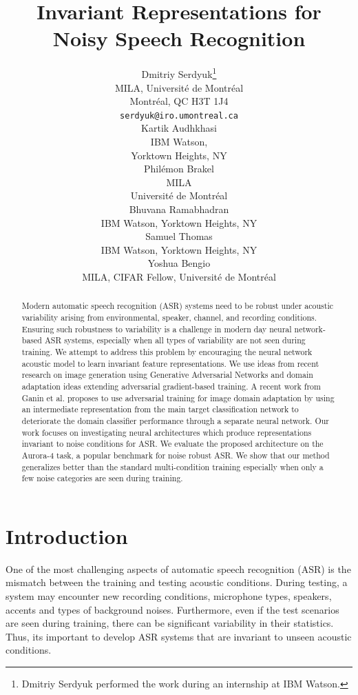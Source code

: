 \documentclass{article}
\title{Invariant Representations for Noisy Speech Recognition}
\author{
  Dmitriy Serdyuk\thanks{Dmitriy Serdyuk performed the work 
    during an internship at IBM Watson.} \\
  MILA,
  Universit\'e de Montr\'eal\\
  Montr\'eal, QC H3T 1J4 \\
  \texttt{serdyuk@iro.umontreal.ca} \\
  \And
  Kartik Audhkhasi \\
  IBM Watson, \\
  Yorktown Heights, NY \\
  \And
  Phil\'emon Brakel \\
  MILA\\
  Universit\'e de Montr\'eal\\
  \And
  Bhuvana Ramabhadran\\
  IBM Watson,
  Yorktown Heights, NY \\
  \And
  Samuel Thomas\\
  IBM Watson,
  Yorktown Heights, NY \\
  \And
  Yoshua Bengio\\
  MILA, CIFAR Fellow,
  Universit\'e de Montr\'eal
}
\begin{document}
%
\maketitle
%
\begin{abstract}
    Modern automatic speech recognition (ASR) systems need to be robust under acoustic variability arising from environmental, speaker, channel, and recording conditions. Ensuring such robustness to variability is a challenge in modern day neural network-based ASR systems, especially when all types of variability are not seen during training. We attempt to address this problem by encouraging the neural network acoustic model to learn invariant feature representations.
    We use ideas from recent research on image generation using
    Generative Adversarial Networks and domain adaptation ideas extending
    adversarial gradient-based training. A recent work from Ganin et al. proposes to
    use adversarial training for image domain adaptation by using an intermediate
    representation from the main target classification network to deteriorate the domain 
    classifier performance through a separate neural network.
    Our work focuses on investigating neural architectures which produce
    representations invariant to noise conditions for ASR.  We evaluate the proposed architecture on the Aurora-4 task, a popular benchmark for
    noise robust ASR. We show that our method generalizes better than the standard multi-condition training especially when only a few noise categories are seen during training.
\end{abstract}
%
%
\section{Introduction}
\label{sec:intro}
    One of the most challenging aspects of automatic speech recognition (ASR)
    is the mismatch between the training and testing acoustic conditions. During
    testing, a system may encounter new recording conditions, microphone types, speakers,
    accents and types of background noises. Furthermore, even if the test scenarios are seen during training, there can be significant variability in their statistics. Thus, its important to develop ASR systems that are invariant to unseen acoustic conditions.
\end{document}
